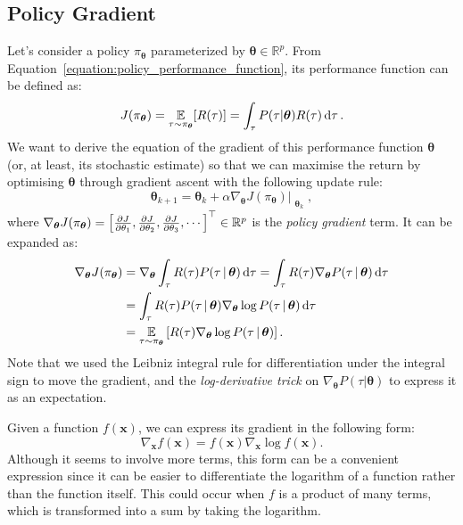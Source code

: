 \subsection{Policy Gradient}

Let's consider a policy $\pi_{\boldsymbol{\theta}}$ parameterized by $\boldsymbol{\theta} \in \mathbb{R}^p$.
From Equation~\eqref{equation:policy_performance_function}, its performance function can be defined as:
%
\begin{equation}
    \label{equation:policy_performance_for_policy_gradient_derivation}
    J(\pi_{\boldsymbol{\theta}}) = \operatorname*{\mathbb{E}}_{\tau \sim \pi_{\boldsymbol{\theta}}} [ R(\tau) ] = \int_\tau P(\tau|\boldsymbol{\theta}) R(\tau) \dd{\tau} .
\end{equation}
%
We want to derive the equation of the gradient of this performance function \wrt $\boldsymbol{\theta}$ (or, at least, its stochastic estimate) so that we can maximise the return by optimising $\boldsymbol{\theta}$ through gradient ascent with the following update rule:
%
\begin{equation}
    \boldsymbol{\theta}_{k+1} =
    \boldsymbol{\theta}_k + \alpha \nabla_{\boldsymbol{\theta}} J(\pi_{\boldsymbol{\theta}})\Bigr|_{\substack{\boldsymbol{\theta}_k}} ,
\end{equation}
%
where $\nabla_{\boldsymbol{\theta}} J(\pi_{\boldsymbol{\theta}}) = \left[ \pdv{J}{\theta_1}, \pdv{J}{\theta_2}, \pdv{J}{\theta_3}, \cdots \right]^\top \in \mathbb{R}^p$ is the \emph{policy gradient} term.
It can be expanded as:
%
\begin{align*}
    \nabla_{\boldsymbol{\theta}} J(\pi_{\boldsymbol{\theta}})
    &= \nabla_{\boldsymbol{\theta}} \int_\tau R(\tau) P(\tau \operatorname{\mid} \boldsymbol{\theta}) \dd{\tau}
    = \int_\tau R(\tau) \nabla_{\boldsymbol{\theta}} P(\tau \operatorname{\mid} \boldsymbol{\theta}) \dd{\tau} \\
    &= \int_\tau R(\tau) P(\tau \operatorname{\mid} \boldsymbol{\theta}) \nabla_{\boldsymbol{\theta}} \log P(\tau \operatorname{\mid} \boldsymbol{\theta}) \dd{\tau} \\
    &= \operatorname*{\mathbb{E}}_{\tau \sim \pi_{\boldsymbol{\theta}}} \left[ R(\tau) \nabla_{\boldsymbol{\theta}} \log P(\tau \operatorname{\mid} \boldsymbol{\theta}) \right]
    .
\end{align*}
%
Note that we used the Leibniz integral rule for differentiation under the integral sign to move the gradient, and the \emph{log-derivative trick} on $\nabla_{\boldsymbol{\theta}} P(\tau|\boldsymbol{\theta})$ to express it as an expectation.
%
\begin{theorem}
    Given a function $f(\boldsymbol{x})$, we can express its gradient in the following form:
    \begin{equation}
        \label{equation:log_derivative_trick}
        \nabla_{\boldsymbol{x}} f(\boldsymbol{x}) = f(\boldsymbol{x}) \nabla_{\boldsymbol{x}} \log f(\boldsymbol{x}) .
    \end{equation}
    Although it seems to involve more terms, this form can be a convenient expression since it can be easier to differentiate the logarithm of a function rather than the function itself.
    This could occur when $f$ is a product of many terms, which is transformed into a sum by taking the logarithm.
\end{theorem}
